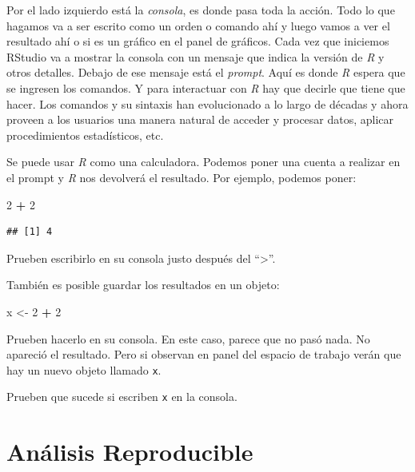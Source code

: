 \documentclass[]{book}
\newenvironment{Shaded}{\begin{snugshade}}{\end{snugshade}}
\newcommand{\DecValTok}[1]{\textcolor[rgb]{0.00,0.00,0.81}{#1}}
\newcommand{\NormalTok}[1]{#1}
\newcommand{\OperatorTok}[1]{\textcolor[rgb]{0.81,0.36,0.00}{\textbf{#1}}}
\newcommand{\StringTok}[1]{\textcolor[rgb]{0.31,0.60,0.02}{#1}}
\theoremstyle{definition}
\theoremstyle{definition}
\theoremstyle{definition}
\theoremstyle{remark}
\begin{document}
Por el lado izquierdo está la \emph{consola}, es donde pasa toda la
acción. Todo lo que hagamos va a ser escrito como un orden o comando ahí
y luego vamos a ver el resultado ahí o si es un gráfico en el panel de
gráficos. Cada vez que iniciemos RStudio va a mostrar la consola con un
mensaje que indica la versión de \emph{R} y otros detalles. Debajo de
ese mensaje está el \emph{prompt}. Aquí es donde \emph{R} espera que se
ingresen los comandos. Y para interactuar con \emph{R} hay que decirle
que tiene que hacer. Los comandos y su sintaxis han evolucionado a lo
largo de décadas y ahora proveen a los usuarios una manera natural de
acceder y procesar datos, aplicar procedimientos estadísticos, etc.

Se puede usar \emph{R} como una calculadora. Podemos poner una cuenta a
realizar en el prompt y \emph{R} nos devolverá el resultado. Por
ejemplo, podemos poner:

\begin{Shaded}
\begin{Highlighting}[]
\DecValTok{2} \OperatorTok{+}\StringTok{ }\DecValTok{2}
\end{Highlighting}
\end{Shaded}

\begin{verbatim}
## [1] 4
\end{verbatim}

Prueben escribirlo en su consola justo después del ``\textgreater{}''.

También es posible guardar los resultados en un objeto:

\begin{Shaded}
\begin{Highlighting}[]
\NormalTok{x <-}\StringTok{ }\DecValTok{2} \OperatorTok{+}\StringTok{ }\DecValTok{2}
\end{Highlighting}
\end{Shaded}

Prueben hacerlo en su consola. En este caso, parece que no pasó nada. No
apareció el resultado. Pero si observan en panel del espacio de trabajo
verán que hay un nuevo objeto llamado \texttt{x}.

Prueben que sucede si escriben \texttt{x} en la consola.

\hypertarget{analisis-reproducible}{%
\section{Análisis Reproducible}\label{analisis-reproducible}}
\end{document}
